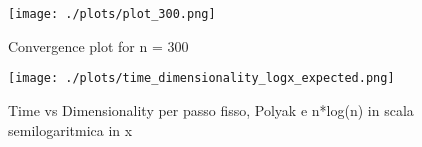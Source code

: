\captionsetup{justification=centering}

\begin{figure}[H]
\centering
    \texttt{[image: ./plots/plot\_300.png]}
    \caption{Convergence plot for n = 300}
    \label{fig:300}
\end{figure} 


\begin{figure}[H]
\centering
    \texttt{[image: ./plots/time\_dimensionality\_logx\_expected.png]}
    \caption{Time vs Dimensionality per passo fisso, Polyak e n*log(n) in scala semilogaritmica in x}
    \label{fig:high_dim3}
\end{figure}

